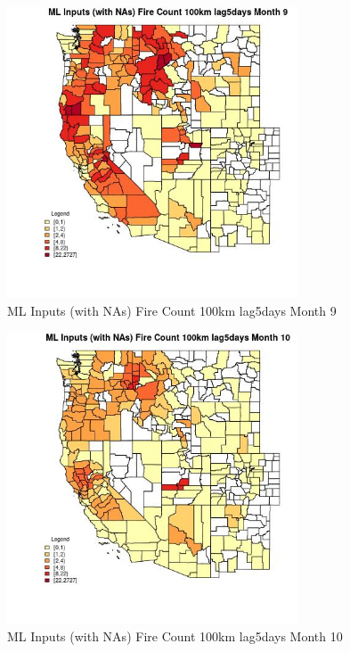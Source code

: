 \begin{figure} 
\centering  
\includegraphics[width=0.77\textwidth]{Code_Outputs/Report_ML_input_PM25_Step4_part_f_de_duplicated_aveswNAs_CountyFire_Count_100km_lag5daysmedianMonth9.jpg} 
\caption{\label{fig:Report_ML_input_PM25_Step4_part_f_de_duplicated_aveswNAsCountyFire_Count_100km_lag5daysmedianMonth9}ML Inputs (with NAs) Fire Count 100km lag5days Month 9} 
\end{figure} 
 

\begin{figure} 
\centering  
\includegraphics[width=0.77\textwidth]{Code_Outputs/Report_ML_input_PM25_Step4_part_f_de_duplicated_aveswNAs_CountyFire_Count_100km_lag5daysmedianMonth10.jpg} 
\caption{\label{fig:Report_ML_input_PM25_Step4_part_f_de_duplicated_aveswNAsCountyFire_Count_100km_lag5daysmedianMonth10}ML Inputs (with NAs) Fire Count 100km lag5days Month 10} 
\end{figure} 
 

